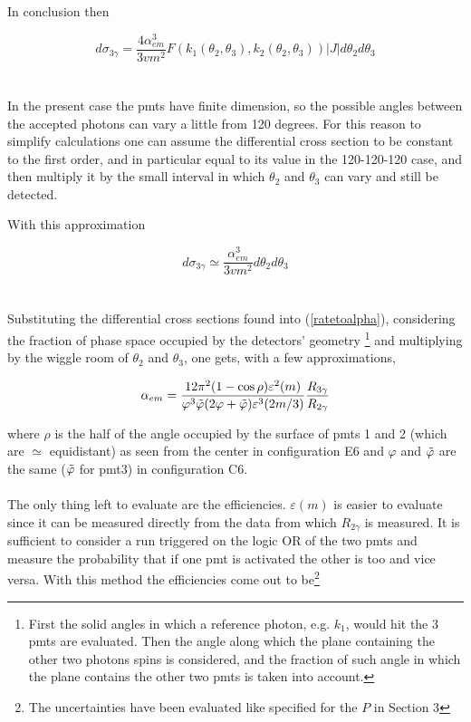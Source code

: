 \documentclass[10pt,a4paper,twocolumn]{article}
\begin{document}
\noindent In conclusion then 


\begin{equation}
    d\sigma_{3\gamma}=\frac{4\alpha_{em}^3}{3vm^2} F(k_1(\theta_2,\theta_3),k_2(\theta_2,\theta_3))|J|d\theta_2d\theta_3
\end{equation}
\\
\\
In the present case the pmts have finite dimension, so the possible angles between the accepted photons can vary a little from 120 degrees. For this reason to simplify calculations one can assume the differential cross section to be constant to the first order, and in particular equal to its value in the 120-120-120 case, and then multiply it by the small interval in which $\theta_2$ and $\theta_3$ can vary and still be detected.

\noindent With this approximation

\begin{equation}
    d\sigma_{3\gamma}\simeq \frac{\alpha_{em}^3}{3vm^2} d\theta_2d\theta_3
\end{equation}
\\
\\
Substituting the differential cross sections found into (\ref{ratetoalpha}), considering the fraction of phase space occupied by the detectors' geometry \footnote{First the solid angles in which a reference photon, e.g. $k_1$, would hit the 3 pmts are evaluated. Then the angle along which the plane containing the other two photons spins is considered, and the fraction of such angle in which the plane contains the other two pmts is taken into account.} and multiplying by the wiggle room of $\theta_2$ and $\theta_3$, one gets, with a few approximations,


\begin{equation}
    \alpha_{em}=\frac{12\pi^2(1-\cos{\rho})\varepsilon^2(m)}{\varphi^3\Tilde{\varphi}(2\varphi+\Tilde{\varphi})\varepsilon^3(2m/3)}\frac{R_{3\gamma}}{R_{2\gamma}}
\end{equation}

where $\rho$ is the half of the angle occupied by the surface of pmts 1 and 2 (which are $\simeq$ equidistant) as seen from the center in configuration E6 and $\varphi$ and $\Tilde{\varphi}$ are the same ($\Tilde{\varphi}$ for pmt3) in configuration C6.
\\
\\
The only thing left to evaluate are the efficiencies. $\varepsilon(m)$ is easier to evaluate since it can be measured directly from the data from which $R_{2\gamma}$ is measured. It is sufficient to consider a run triggered on the logic OR of the two pmts and measure the probability that if one pmt is activated the other is too and vice versa. With this method the efficiencies come out to be\footnote{The uncertainties have been evaluated like specified for the $P$ in Section 3}
\end{document}
